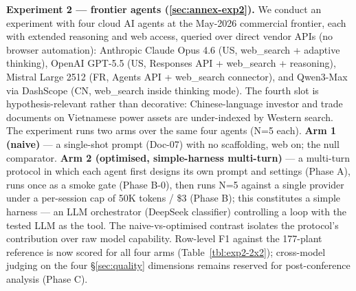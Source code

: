 \documentclass[a4paper,11pt]{article}
\begin{document}
\textbf{Experiment 2 --- frontier agents (\ref{sec:annex-exp2}).} We
conduct an experiment with four cloud AI agents at the May-2026
commercial frontier, each with extended reasoning and web access,
queried over direct vendor APIs (no browser automation): Anthropic
Claude Opus 4.6 (US, web\_search + adaptive thinking), OpenAI GPT-5.5
(US, Responses API + web\_search + reasoning), Mistral Large 2512 (FR,
Agents API + web\_search connector), and Qwen3-Max via DashScope (CN,
web\_search inside thinking mode). The fourth slot is
hypothesis-relevant rather than decorative: Chinese-language investor
and trade documents on Vietnamese power assets are under-indexed by
Western search. The experiment runs two arms over the same four agents
(N=5 each). \textbf{Arm 1 (naive)} --- a single-shot prompt (Doc-07)
with no scaffolding, web on; the null comparator. \textbf{Arm 2
(optimised, simple-harness multi-turn)} --- a multi-turn protocol in
which each agent first designs its own prompt and settings (Phase A),
runs once as a smoke gate (Phase B-0), then runs N=5 against a single
provider under a per-session cap of 50K tokens / \$3 (Phase B); this
constitutes a simple harness --- an LLM orchestrator (DeepSeek
classifier) controlling a loop with the tested LLM as the tool. The
naive-vs-optimised contrast isolates the protocol's contribution over
raw model capability. Row-level F1 against the 177-plant reference is
now scored for all four arms (Table~\ref{tbl:exp2-2x2}); cross-model
judging on the four §\ref{sec:quality} dimensions remains reserved for
post-conference analysis (Phase C).
\end{document}
